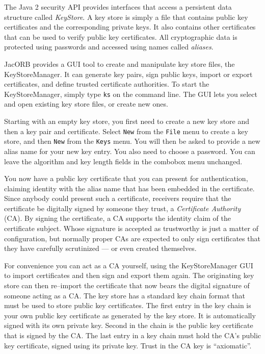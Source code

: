 \documentclass[12pt]{scrbook}
\begin{document}
The Java 2  security API provides interfaces that  access a persistent
data structure  called {\em  KeyStore}. A key  store is simply  a file
that contains  public key  certificates and the  corresponding private
keys. It also  contains other certificates that can  be used to verify
public key  certificates.  All  cryptographic data is  protected using
passwords and accessed using names called {\em aliases}.

JacORB provides a  GUI tool to create and  manipulate key store files,
the  KeyStoreManager. It  can generate  key pairs,  sign  public keys,
import  or   export  certificates,  and   define  trusted  certificate
authorities. To start the KeyStoreManager, simply type {\tt ks} on the
command  line. The GUI  lets you  select and  open existing  key store
files, or create new ones.

Starting with an  empty key store, you first need to  create a new key
store and then  a key pair and certificate. Select  {\tt New} from the
{\tt File}  menu to create  a key store,  and then {\tt New}  from the
{\tt Keys} menu.   You will then be asked to provide  a new alias name
for your  new key entry. You also  need to choose a  password. You can
leave  the  algorithm  and  key  length fields  in  the  combobox  menu
unchanged.

\bigskip
\centerline{}

You  now  have a  public  key certificate  that  you  can present  for
authentication, claiming  identity with the  alias name that  has been
embedded  in the  certificate.   Since anybody  could  present such  a
certificate,  receivers  require  that  the certificate  be  digitally
signed by someone  they trust, a {\em Certificate  Authority} (CA). By
signing  the certificate,  a CA  supports  the identity  claim of  the
certificate  subject. Whose  signature is  accepted as  trustworthy is
just a matter  of configuration, but normally proper  CAs are expected
to only sign certificates that  they have carefully scrutinized --- or
even created themselves.

\bigskip
\centerline{}

For   convenience  you   can  act   as  a   CA  yourself,   using  the
KeyStoreManager GUI  to import certificates  and then sign  and export
them  again.   The  originating  key  store can  then  re--import  the
certificate that now bears the  digital signature of someone acting as
a CA. The key store has a  standard key chain format that must be used
to store public key certificates. The  first entry in the key chain is
your own public  key certificate as generated by the  key store. It is
automatically signed with its own  private key. Second in the chain is
the public key certificate that is signed by the CA. The last entry in
a key  chain must hold the  CA's public key  certificate, signed using
its private key. Trust in the CA key is ``axiomatic''.
\end{document}
